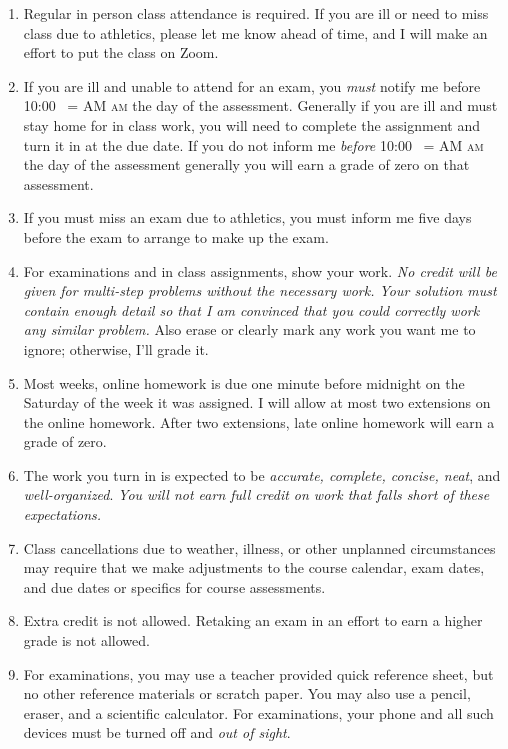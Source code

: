 \documentclass[12pt]{article}
\makeatletter
\newcounter{ex}\setcounter{ex}{0}
\DeclareRobustCommand{\maybefakesc}[1]{%
  \ifnum\pdfstrcmp{\f@series}{\bfdefault}=\z@
    {\fontsize{\dimexpr0.8\dimexpr\f@size pt\relax}{0}\selectfont\uppercase{#1}}%
  \else
    \textsc{#1}%
  \fi
}
\newcommand\AM{\,\maybefakesc{am}\xspace}
\makeatother
\begin{document}
\begin{enumerate}

\item Regular in person class attendance is required. If you are ill or need to miss class due to athletics, please let me know ahead of time, and I will make an effort to put the class on Zoom.

\item If you are ill and unable to attend  for an exam, you \emph{must} notify me before 10:00 \AM the day of the assessment. Generally if you are ill and must stay home for in class work, you will need to complete the assignment and turn it in at the due date. If you do not inform me \emph{before} 10:00 \AM the day of the assessment generally you will earn a grade of zero on that assessment.

\item If you must miss an exam due to  athletics, you must inform me five days before the exam to arrange to make up the exam. 

\item For examinations and in class assignments, show your work.  \emph{No credit will be given for multi-step problems without the necessary work. Your solution must contain enough detail so that I am convinced that you could correctly work any similar problem.} Also erase or clearly mark any work you want me to ignore; otherwise, I'll grade it.  

\item Most weeks, online homework is due one minute before midnight on the
Saturday of the week it was assigned. I will allow at most two 
extensions on the online homework. After two extensions, late online
homework will earn a grade of zero.

\item The work you turn in is expected to be \emph{accurate,  complete, concise, neat}, and \emph{well-organized}.  
\emph{You will not earn full credit on work that falls short of these expectations.}

\item Class cancellations due to weather, illness, or other unplanned circumstances may require that we make  adjustments
to the course calendar, exam dates, and due dates or specifics for course assessments. 

\item Extra credit is not allowed. Retaking an exam in an effort to 
earn a higher grade is not allowed.

\item For examinations, you may use a teacher provided quick reference sheet, but no other reference materials or scratch paper. You may also use a pencil, eraser, and a scientific calculator. For examinations, your phone and all such
devices must be turned off and \emph{out of sight}. 


\end{enumerate}
\end{document}
